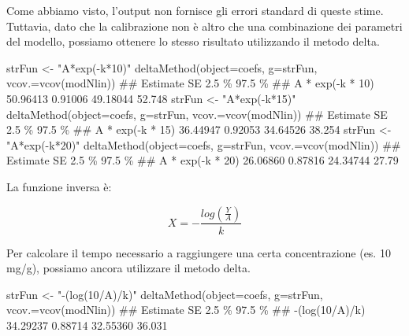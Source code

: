 \documentclass[a4paper,12pt,oneside]{book}
\newenvironment{Shaded}{\begin{snugshade}}{\end{snugshade}}
\newcommand{\StringTok}[1]{#1}
\newcommand{\DocumentationTok}[1]{#1}
\newcommand{\OtherTok}[1]{#1}
\newcommand{\FunctionTok}[1]{#1}
\newcommand{\AttributeTok}[1]{#1}
\newcommand{\NormalTok}[1]{#1}
\begin{document}
Come abbiamo visto, l'output non fornisce gli errori standard di queste stime. Tuttavia, dato che la calibrazione non è altro che una combinazione dei parametri del modello, possiamo ottenere lo stesso risultato utilizzando il metodo delta.

\begin{Shaded}
\begin{Highlighting}[]
\NormalTok{strFun }\OtherTok{\textless{}{-}} \StringTok{"A*exp({-}k*10)"}
\FunctionTok{deltaMethod}\NormalTok{(}\AttributeTok{object=}\NormalTok{coefs, }\AttributeTok{g=}\NormalTok{strFun, }\AttributeTok{vcov.=}\FunctionTok{vcov}\NormalTok{(modNlin))}
\DocumentationTok{\#\#                  Estimate       SE    2.5 \% 97.5 \%}
\DocumentationTok{\#\# A * exp({-}k * 10) 50.96413  0.91006 49.18044 52.748}
\NormalTok{strFun }\OtherTok{\textless{}{-}} \StringTok{"A*exp({-}k*15)"}
\FunctionTok{deltaMethod}\NormalTok{(}\AttributeTok{object=}\NormalTok{coefs, }\AttributeTok{g=}\NormalTok{strFun, }\AttributeTok{vcov.=}\FunctionTok{vcov}\NormalTok{(modNlin))}
\DocumentationTok{\#\#                  Estimate       SE    2.5 \% 97.5 \%}
\DocumentationTok{\#\# A * exp({-}k * 15) 36.44947  0.92053 34.64526 38.254}
\NormalTok{strFun }\OtherTok{\textless{}{-}} \StringTok{"A*exp({-}k*20)"}
\FunctionTok{deltaMethod}\NormalTok{(}\AttributeTok{object=}\NormalTok{coefs, }\AttributeTok{g=}\NormalTok{strFun, }\AttributeTok{vcov.=}\FunctionTok{vcov}\NormalTok{(modNlin))}
\DocumentationTok{\#\#                  Estimate       SE    2.5 \% 97.5 \%}
\DocumentationTok{\#\# A * exp({-}k * 20) 26.06860  0.87816 24.34744  27.79}
\end{Highlighting}
\end{Shaded}

La funzione inversa è:

\[X = - \frac{log \left( \frac{Y}{A} \right)}{k} \]

Per calcolare il tempo necessario a raggiungere una certa concentrazione (es. 10 mg/g), possiamo ancora utilizzare il metodo delta.

\begin{Shaded}
\begin{Highlighting}[]
\NormalTok{strFun }\OtherTok{\textless{}{-}} \StringTok{"{-}(log(10/A)/k)"}
\FunctionTok{deltaMethod}\NormalTok{(}\AttributeTok{object=}\NormalTok{coefs, }\AttributeTok{g=}\NormalTok{strFun, }\AttributeTok{vcov.=}\FunctionTok{vcov}\NormalTok{(modNlin))}
\DocumentationTok{\#\#                Estimate       SE    2.5 \% 97.5 \%}
\DocumentationTok{\#\# {-}(log(10/A)/k) 34.29237  0.88714 32.55360 36.031}
\end{Highlighting}
\end{Shaded}
\end{document}
